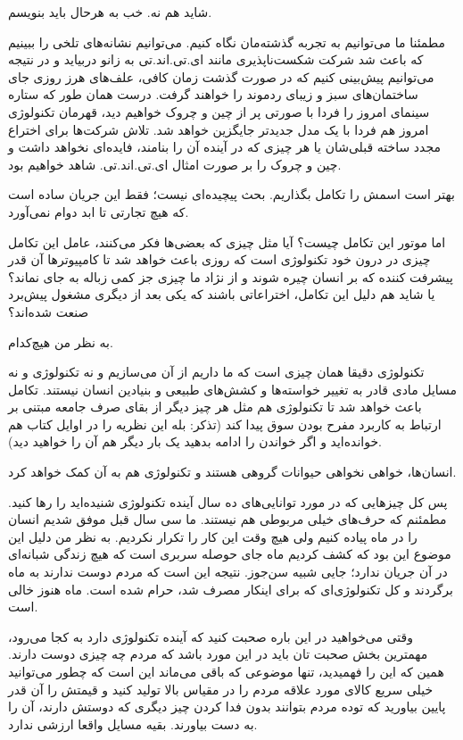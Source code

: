 شاید هم نه. خب به هرحال باید بنویسم.

مطمئنا ما می‌توانیم به تجربه گذشته‌مان نگاه کنیم. می‌توانیم نشانه‌های تلخی
را ببینیم که باعث شد شرکت شکست‌ناپذیری مانند
ای.تی.اند.تی به زانو دربیاید و در نتیجه می‌توانیم
پیش‌بینی کنیم که در صورت گذشت زمان کافی، علف‌های هرز روزی جای ساختمان‌های
سبز و زیبای ردموند
را خواهند گرفت. درست همان طور که ستاره سینمای امروز را فردا با صورتی
پر از چین و چروک خواهیم دید، قهرمان تکنولوژی امروز هم فردا با یک مدل
جدیدتر جایگزین خواهد شد. تلاش شرکت‌ها برای اختراع مجدد ساخته قبلی‌شان یا
هر چیزی که در آینده آن را بنامند، فایده‌ای نخواهد داشت و چین و چروک را
بر صورت امثال ای.تی.اند.تی. شاهد خواهیم بود.

بهتر است اسمش را تکامل بگذاریم. بحث پیچیده‌ای نیست؛ فقط این جریان ساده
است که هیچ تجارتی تا ابد دوام نمی‌آورد.

اما موتور این تکامل چیست؟‌ آیا مثل چیزی که بعضی‌ها فکر می‌کنند، عامل این
تکامل چیزی در درون خود تکنولوژی است که روزی باعث خواهد شد تا
کامپیوترها آن قدر پیشرفت کننده که بر انسان چیره شوند و از نژاد ما چیزی
جز کمی زباله به جای نماند؟ یا شاید هم دلیل این تکامل، اختراعاتی باشند
که یکی بعد از دیگری مشغول پیش‌برد صنعت شده‌اند؟

به نظر من هیچ‌کدام. 

تکنولوژی دقیقا همان چیزی است که ما داریم از آن می‌سازیم و نه تکنولوژی و
نه مسایل مادی قادر به تغییر خواسته‌ها و کشش‌های طبیعی و بنیادین انسان
نیستند. تکامل باعث خواهد شد تا تکنولوژی هم مثل هر چیز دیگر از بقای صرف
جامعه مبتنی بر ارتباط به کاربرد مفرح بودن سوق پیدا کند (تذکر: بله این
نظریه را در اوایل کتاب هم خوانده‌اید و اگر خواندن را ادامه بدهید یک بار
دیگر هم آن را خواهید دید).

انسان‌ها، خواهی نخواهی حیوانات گروهی هستند و تکنولوژی هم به آن کمک
خواهد کرد.

پس کل چیزهایی که در مورد توانایی‌های ده سال آینده تکنولوژی شنیده‌اید را
رها کنید. مطمئنم که حرف‌های خیلی مربوطی هم نیستند. ما سی سال قبل موفق
شدیم انسان را در ماه پیاده کنیم ولی هیچ وقت این کار را تکرار
نکردیم. به نظر من دلیل این موضوع این بود که کشف کردیم ماه جای حوصله
سربری است که هیچ زندگی شبانه‌ای در آن جریان ندارد؛ جایی شبیه
سن‌جوز. نتیجه این است که مردم دوست ندارند به ماه برگردند و کل
تکنولوژی‌ای که برای اینکار مصرف شد، حرام شده است. ماه هنوز خالی است.

وقتی می‌خواهید در این باره صحبت کنید که آینده تکنولوژی دارد به کجا
می‌رود، مهمترین بخش صحبت تان باید در این مورد باشد که مردم چه چیزی دوست
دارند. همین که این را فهمیدید، تنها موضوعی که باقی می‌ماند این است که
چطور می‌توانید خیلی سریع کالای مورد علاقه مردم را در مقیاس بالا تولید
کنید و قیمتش را آن قدر پایین بیاورید که توده مردم بتوانند بدون فدا
کردن چیز دیگری که دوستش دارند، آن را به دست بیاورند. بقیه مسایل واقعا
ارزشی ندارد.

